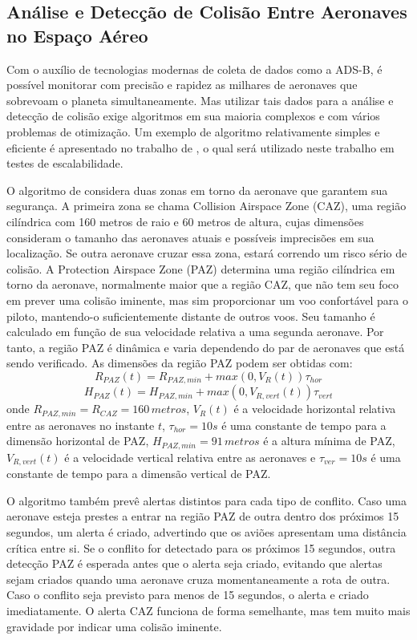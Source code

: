 \subsection{Análise e Detecção de Colisão Entre Aeronaves no Espaço Aéreo}
Com o auxílio de tecnologias modernas de coleta de dados como a ADS-B, é possível monitorar com precisão e rapidez as milhares de aeronaves que sobrevoam o planeta simultaneamente. Mas utilizar tais dados para a análise e detecção de colisão exige algoritmos em sua maioria complexos e com vários problemas de otimização. Um exemplo de algoritmo relativamente simples e eficiente é apresentado no trabalho de , o qual será utilizado neste trabalho em testes de escalabilidade.

O algoritmo de  considera duas zonas em torno da aeronave que garantem sua segurança. A primeira zona se chama Collision Airspace Zone (CAZ), uma região cilíndrica com 160 metros de raio e 60 metros de altura, cujas dimensões consideram o tamanho das aeronaves atuais e possíveis imprecisões em sua localização. Se outra aeronave cruzar essa zona, estará correndo um risco sério de colisão. A Protection Airspace Zone (PAZ) determina uma região cilíndrica em torno da aeronave, normalmente maior que a região CAZ, que não tem seu foco em prever uma colisão iminente, mas sim proporcionar um voo confortável para o piloto, mantendo-o suficientemente distante de outros voos. Seu tamanho é calculado em função de sua velocidade relativa a uma segunda aeronave. Por tanto, a região PAZ é dinâmica e varia dependendo do par de aeronaves que está sendo verificado. As dimensões da região PAZ podem ser obtidas com:
\[ R_{PAZ}(t) = R_{PAZ, min} + max(0, V_{R}(t))\tau _{hor} \]
\[ H_{PAZ}(t) = H_{PAZ, min} + max(0, V_{R, vert}(t))\tau _{vert} \]
onde \(R_{PAZ, min} = R_{CAZ} = 160\, metros\), \(V_{R}(t)\) é a velocidade horizontal relativa entre as aeronaves no instante \(t\), \(\tau_{hor} = 10s\) é uma constante de tempo para a dimensão horizontal de PAZ, \(H_{PAZ, min} = 91\, metros\) é a altura mínima de PAZ, \(V_{R, vert}(t)\) é a velocidade vertical relativa entre as aeronaves e \(\tau_{ver} = 10s\) é uma constante de tempo para a dimensão vertical de PAZ.

O algoritmo também prevê alertas distintos para cada tipo de conflito. Caso uma aeronave esteja prestes a entrar na região PAZ de outra dentro dos próximos 15 segundos, um alerta é criado, advertindo que os aviões apresentam uma distância crítica entre si. Se o conflito for detectado para os próximos 15 segundos, outra detecção PAZ é esperada antes que o alerta seja criado, evitando que alertas sejam criados quando uma aeronave cruza momentaneamente a rota de outra. Caso o conflito seja previsto para menos de 15 segundos, o alerta e criado imediatamente. O alerta CAZ funciona de forma semelhante, mas tem muito mais gravidade por indicar uma colisão iminente.

